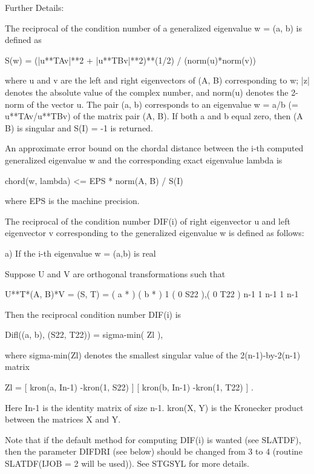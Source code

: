 \begin{DoxyParagraph}{Further Details\+: }
\begin{DoxyVerb}  The reciprocal of the condition number of a generalized eigenvalue
  w = (a, b) is defined as

       S(w) = (|u**TAv|**2 + |u**TBv|**2)**(1/2) / (norm(u)*norm(v))

  where u and v are the left and right eigenvectors of (A, B)
  corresponding to w; |z| denotes the absolute value of the complex
  number, and norm(u) denotes the 2-norm of the vector u.
  The pair (a, b) corresponds to an eigenvalue w = a/b (= u**TAv/u**TBv)
  of the matrix pair (A, B). If both a and b equal zero, then (A B) is
  singular and S(I) = -1 is returned.

  An approximate error bound on the chordal distance between the i-th
  computed generalized eigenvalue w and the corresponding exact
  eigenvalue lambda is

       chord(w, lambda) <= EPS * norm(A, B) / S(I)

  where EPS is the machine precision.

  The reciprocal of the condition number DIF(i) of right eigenvector u
  and left eigenvector v corresponding to the generalized eigenvalue w
  is defined as follows:

  a) If the i-th eigenvalue w = (a,b) is real

     Suppose U and V are orthogonal transformations such that

              U**T*(A, B)*V  = (S, T) = ( a   *  ) ( b  *  )  1
                                        ( 0  S22 ),( 0 T22 )  n-1
                                          1  n-1     1 n-1

     Then the reciprocal condition number DIF(i) is

                Difl((a, b), (S22, T22)) = sigma-min( Zl ),

     where sigma-min(Zl) denotes the smallest singular value of the
     2(n-1)-by-2(n-1) matrix

         Zl = [ kron(a, In-1)  -kron(1, S22) ]
              [ kron(b, In-1)  -kron(1, T22) ] .

     Here In-1 is the identity matrix of size n-1. kron(X, Y) is the
     Kronecker product between the matrices X and Y.

     Note that if the default method for computing DIF(i) is wanted
     (see SLATDF), then the parameter DIFDRI (see below) should be
     changed from 3 to 4 (routine SLATDF(IJOB = 2 will be used)).
     See STGSYL for more details.


\end{DoxyVerb}
\end{DoxyParagraph}
